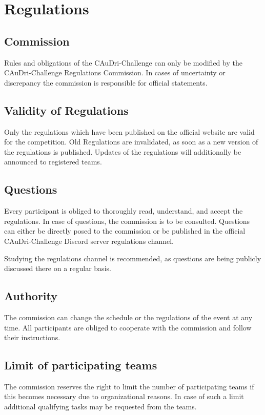 \chapter{Regulations}

\section{Commission}

Rules and obligations of the CAuDri-Challenge can only be modified by the
CAuDri-Challenge Regulations Commission.  In cases of uncertainty or discrepancy 
the commission is responsible for official statements.

\section{Validity of Regulations}

Only the regulations which have been published on the official website are
valid for the competition. Old Regulations are invalidated, as soon as a new
version of the regulations is published. Updates of the regulations will
additionally be announced to registered teams.

\section{Questions}

Every participant is obliged to thoroughly read, understand, and accept the
regulations. In case of questions, the commission is to be consulted. Questions
can either be directly posed to the commission or be published in the official
CAuDri-Challenge Discord server regulations channel.

Studying the regulations channel is recommended, as questions are being
publicly discussed there on a regular basis.

\section{Authority}

The commission can change the schedule or the regulations of the event at any
time. All participants are obliged to cooperate with the commission and follow
their instructions.

\section{Limit of participating teams}

The commission reserves the right to limit the number of participating teams if
this becomes necessary due to organizational reasons. In case of such a limit
additional qualifying tasks may be requested from the teams.
